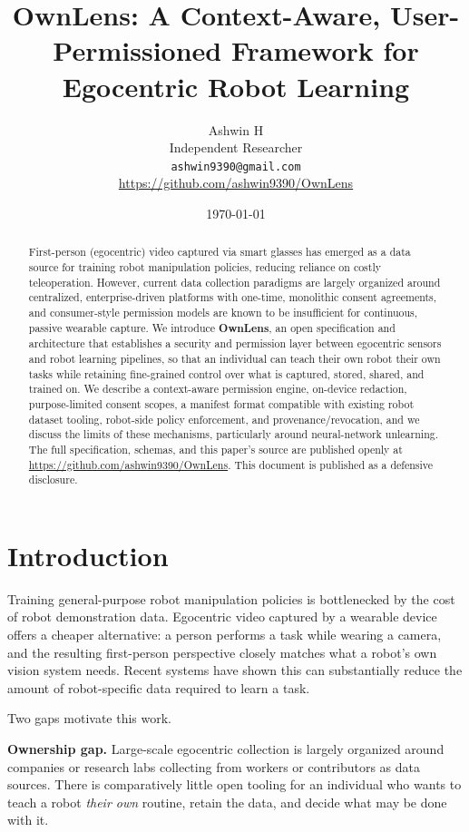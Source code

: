 \documentclass[10pt,twocolumn,letterpaper]{article}
\title{OwnLens: A Context-Aware, User-Permissioned Framework for Egocentric Robot Learning}
\author{
Ashwin H \\
Independent Researcher \\
{\tt\small ashwin9390@gmail.com} \\
\small{\url{https://github.com/ashwin9390/OwnLens}}
}
\date{\small\today}
\begin{document}
\maketitle

\begin{abstract}
First-person (egocentric) video captured via smart glasses has emerged as a data source for training robot manipulation policies, reducing reliance on costly teleoperation. However, current data collection paradigms are largely organized around centralized, enterprise-driven platforms with one-time, monolithic consent agreements, and consumer-style permission models are known to be insufficient for continuous, passive wearable capture. We introduce \textbf{OwnLens}, an open specification and architecture that establishes a security and permission layer between egocentric sensors and robot learning pipelines, so that an individual can teach their own robot their own tasks while retaining fine-grained control over what is captured, stored, shared, and trained on. We describe a context-aware permission engine, on-device redaction, purpose-limited consent scopes, a manifest format compatible with existing robot dataset tooling, robot-side policy enforcement, and provenance/revocation, and we discuss the limits of these mechanisms, particularly around neural-network unlearning. The full specification, schemas, and this paper's source are published openly at \url{https://github.com/ashwin9390/OwnLens}. This document is published as a defensive disclosure.
\end{abstract}

\section{Introduction}

Training general-purpose robot manipulation policies is bottlenecked by the cost of robot demonstration data. Egocentric video captured by a wearable device offers a cheaper alternative: a person performs a task while wearing a camera, and the resulting first-person perspective closely matches what a robot's own vision system needs. Recent systems have shown this can substantially reduce the amount of robot-specific data required to learn a task.

Two gaps motivate this work.

\textbf{Ownership gap.} Large-scale egocentric collection is largely organized around companies or research labs collecting from workers or contributors as data sources. There is comparatively little open tooling for an individual who wants to teach a robot \emph{their own} routine, retain the data, and decide what may be done with it.
\end{document}

